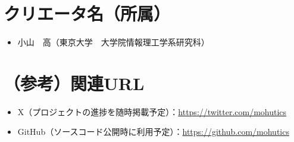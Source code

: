 \documentclass[uplatex,a4paper,12pt]{jsarticle}
\begin{document}
\section{クリエータ名（所属）}
\begin{itemize}
  \item 小山　高（東京大学　大学院情報理工学系研究科）
\end{itemize}

\section*{（参考）関連URL} %
\begin{itemize}
  \item X（プロジェクトの進捗を随時掲載予定）：\url{https://twitter.com/mohutics}
  \item GitHub（ソースコード公開時に利用予定）：\url{https://github.com/mohutics}
\end{itemize}
\end{document}
